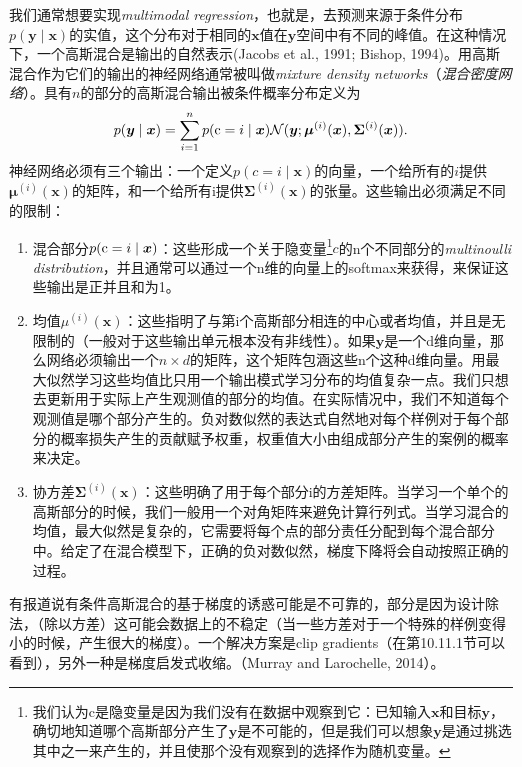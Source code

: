 我们通常想要实现\emph{multimodal regression}，也就是，去预测来源于条件分布$p(\bm{y}\mid\bm{x})$的实值，这个分布对于相同的$\bm{x}$值在$\bm{y}$空间中有不同的峰值。在这种情况下，一个高斯混合是输出的自然表示(Jacobs et al., 1991; Bishop, 1994)。用高斯混合作为它们的输出的神经网络通常被叫做\emph{mixture density networks}（\emph{混合密度网络}）。具有$n$的部分的高斯混合输出被条件概率分布定义为
\begin{equation}
p(\bm{y}\mid\bm{x}) = \sum_{i=1}^n p(\mathrm{c} = i \mid \bm{x}) \mathcal{N}(\bm{y}; \bm{\mu}^{(i)}(\bm{x}), \bm{\Sigma}^{(i)}(\bm{x})).
\end{equation}
神经网络必须有三个输出：一个定义$p(c=i\mid\bm{x})$的向量，一个给所有的$i$提供$\bm{\mu}^{(i)}(\bm{x})$的矩阵，和一个给所有i提供$\bm{\Sigma}^{(i)}(\bm{x})$的张量。这些输出必须满足不同的限制：
\begin{enumerate}
\item 混合部分$p(\mathrm{c}=i\mid\bm{x})$：这些形成一个关于隐变量\footnote{我们认为c是隐变量是因为我们没有在数据中观察到它：已知输入$\bm{x}$和目标$\bm{y}$，确切地知道哪个高斯部分产生了$\bm{y}$是不可能的，但是我们可以想象$\bm{y}$是通过挑选其中之一来产生的，并且使那个没有观察到的选择作为随机变量。
}$c$的n个不同部分的\emph{multinoulli distribution}，并且通常可以通过一个n维的向量上的softmax来获得，来保证这些输出是正并且和为1。

\item 均值$\mu^(i)(\bm{x})$：这些指明了与第i个高斯部分相连的中心或者均值，并且是无限制的（一般对于这些输出单元根本没有非线性）。如果$\bm{y}$是一个d维向量，那么网络必须输出一个$n\times d$的矩阵，这个矩阵包涵这些n个这种d维向量。用最大似然学习这些均值比只用一个输出模式学习分布的均值复杂一点。我们只想去更新用于实际上产生观测值的部分的均值。在实际情况中，我们不知道每个观测值是哪个部分产生的。负对数似然的表达式自然地对每个样例对于每个部分的概率损失产生的贡献赋予权重，权重值大小由组成部分产生的案例的概率来决定。

\item 协方差$\bm{\Sigma}^{(i)}(\bm{x})$：这些明确了用于每个部分i的方差矩阵。当学习一个单个的高斯部分的时候，我们一般用一个对角矩阵来避免计算行列式。当学习混合的均值，最大似然是复杂的，它需要将每个点的部分责任分配到每个混合部分中。给定了在混合模型下，正确的负对数似然，梯度下降将会自动按照正确的过程。
\end{enumerate}

有报道说有条件高斯混合的基于梯度的诱惑可能是不可靠的，部分是因为设计除法，（除以方差）这可能会数据上的不稳定（当一些方差对于一个特殊的样例变得小的时候，产生很大的梯度）。一个解决方案是clip gradients（在第10.11.1节可以看到），另外一种是梯度启发式收缩。（Murray and Larochelle, 2014）。

